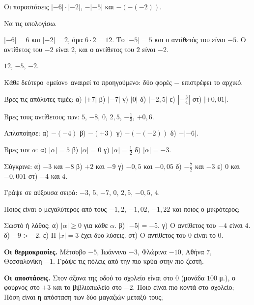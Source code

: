 \tixero Οι παραστάσεις $|-6|\cdot|-2|$, $-|-5|$ και $-(-(-2))$.\par
\tithelo Να τις υπολογίσω.\par
\possindeo $|-6|=6$ και $|-2|=2$, άρα $6\cdot2=12$. Το $|-5|=5$ και ο αντίθετός του είναι $-5$. Ο αντίθετος του $-2$ είναι $2$, και ο αντίθετος του $2$ είναι $-2$.\par
\apantisi $12$, $-5$, $-2$.\par
\elegxos Κάθε δεύτερο «μείον» αναιρεί το προηγούμενο: δύο φορές $-$ επιστρέφει το αρχικό.



\ex Βρες τις απόλυτες τιμές: α) $|+7|$ \quad β) $|-7|$ \quad γ) $|0|$ \quad δ) $|-2{,}5|$ \quad ε) $\left|-\frac{3}{4}\right|$ \quad στ) $|+0{,}01|$.

\ex Βρες τους αντίθετους των: $5$, $-8$, $0$, $2{,}5$, $-\frac{1}{3}$, $+0{,}6$.

\ex Απλοποίησε: α) $-(-4)$ \quad β) $-(+3)$ \quad γ) $-(-(-2))$ \quad δ) $-|-6|$.

\ex Βρες τον $\alpha$: α) $|\alpha|=5$ \quad β) $|\alpha|=0$ \quad γ) $|\alpha|=\frac{1}{2}$ \quad δ) $|\alpha|=-3$.

\ex Σύγκρινε: α) $-3$ και $-8$ \quad β) $+2$ και $-9$ \quad γ) $-0{,}5$ και $-0{,}05$ \quad δ) $-\frac{7}{2}$ και $-3$ \quad ε) $0$ και $-0{,}001$ \quad στ) $-4$ και $4$.

\ex Γράψε σε αύξουσα σειρά: $-3$, $5$, $-7$, $0$, $2{,}5$, $-0{,}5$, $4$.

\ex Ποιος είναι ο μεγαλύτερος από τους $-1{,}2$, $-1{,}02$, $-1{,}22$ και ποιος ο μικρότερος;

\ex Σωστό ή λάθος; α) $|\alpha|\ge0$ για κάθε $\alpha$. \quad β) $|-5|=-5$. \quad γ) Ο αντίθετος του $-4$ είναι $4$. \quad δ) $-9>-2$. \quad ε) Η $|x|=3$ έχει δύο λύσεις. \quad στ) Ο αντίθετος του $0$ είναι το $0$.


\ex \textbf{Οι θερμοκρασίες.} Μέτσοβο $-5$, Ιωάννινα $-3$, Φλώρινα $-10$, Αθήνα $7$, Θεσσαλονίκη $-1$. Γράψε τις πόλεις από την πιο κρύα στην πιο ζεστή.

\ex \textbf{Οι αποστάσεις.} Στον άξονα της οδού το σχολείο είναι στο $0$ (μονάδα $100$ μ.), ο φούρνος στο $+3$ και το βιβλιοπωλείο στο $-2$. Ποιο είναι πιο κοντά στο σχολείο; Πόση είναι η απόσταση των δύο μαγαζιών μεταξύ τους;

